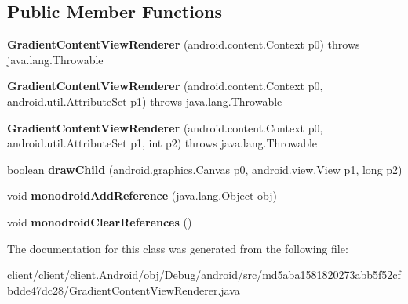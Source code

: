 \subsection*{Public Member Functions}
\begin{DoxyCompactItemize}
\item 
\hypertarget{classmd5aba1581820273abb5f52cfbdde47dc28_1_1GradientContentViewRenderer_ab1073e4e6f8d163770eb552ddea7f0dd}{}{\bfseries Gradient\+Content\+View\+Renderer} (android.\+content.\+Context p0)  throws java.\+lang.\+Throwable 	\label{classmd5aba1581820273abb5f52cfbdde47dc28_1_1GradientContentViewRenderer_ab1073e4e6f8d163770eb552ddea7f0dd}

\item 
\hypertarget{classmd5aba1581820273abb5f52cfbdde47dc28_1_1GradientContentViewRenderer_acdca58ce0f61282fb49802a3ab9d2b3f}{}{\bfseries Gradient\+Content\+View\+Renderer} (android.\+content.\+Context p0, android.\+util.\+Attribute\+Set p1)  throws java.\+lang.\+Throwable 	\label{classmd5aba1581820273abb5f52cfbdde47dc28_1_1GradientContentViewRenderer_acdca58ce0f61282fb49802a3ab9d2b3f}

\item 
\hypertarget{classmd5aba1581820273abb5f52cfbdde47dc28_1_1GradientContentViewRenderer_aa30b8c839b54675cc32a3f6717b5bb53}{}{\bfseries Gradient\+Content\+View\+Renderer} (android.\+content.\+Context p0, android.\+util.\+Attribute\+Set p1, int p2)  throws java.\+lang.\+Throwable 	\label{classmd5aba1581820273abb5f52cfbdde47dc28_1_1GradientContentViewRenderer_aa30b8c839b54675cc32a3f6717b5bb53}

\item 
\hypertarget{classmd5aba1581820273abb5f52cfbdde47dc28_1_1GradientContentViewRenderer_a5151fc20e645df9296d8711df869cbee}{}boolean {\bfseries draw\+Child} (android.\+graphics.\+Canvas p0, android.\+view.\+View p1, long p2)\label{classmd5aba1581820273abb5f52cfbdde47dc28_1_1GradientContentViewRenderer_a5151fc20e645df9296d8711df869cbee}

\item 
\hypertarget{classmd5aba1581820273abb5f52cfbdde47dc28_1_1GradientContentViewRenderer_a1c6dbda47227f2b323e07e7f01aa53e8}{}void {\bfseries monodroid\+Add\+Reference} (java.\+lang.\+Object obj)\label{classmd5aba1581820273abb5f52cfbdde47dc28_1_1GradientContentViewRenderer_a1c6dbda47227f2b323e07e7f01aa53e8}

\item 
\hypertarget{classmd5aba1581820273abb5f52cfbdde47dc28_1_1GradientContentViewRenderer_abd45c13bd4f4b9a782591cfc6d39bcad}{}void {\bfseries monodroid\+Clear\+References} ()\label{classmd5aba1581820273abb5f52cfbdde47dc28_1_1GradientContentViewRenderer_abd45c13bd4f4b9a782591cfc6d39bcad}

\end{DoxyCompactItemize}


The documentation for this class was generated from the following file\+:\begin{DoxyCompactItemize}
\item 
client/client/client.\+Android/obj/\+Debug/android/src/md5aba1581820273abb5f52cfbdde47dc28/Gradient\+Content\+View\+Renderer.\+java\end{DoxyCompactItemize}
